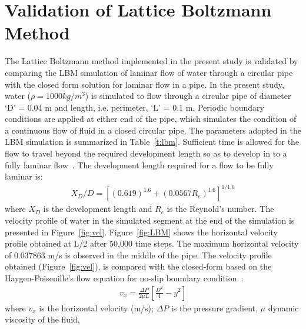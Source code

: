 \section{Validation of Lattice Boltzmann Method}
The Lattice Boltzmann method implemented in the present study is validated by comparing the LBM simulation of laminar flow of water through a circular pipe with the closed form solution for laminar flow in a pipe. In the present study, water ($\rho=1000 kg/m^{3}$) is simulated to flow through a circular pipe of diameter `D' = 0.04 m and length, i.e. perimeter, `L' = 0.1 m. Periodic boundary conditions are applied at either end of the pipe, which simulates the condition of a continuous flow of fluid in a closed circular pipe. The parameters adopted in the LBM simulation is summarized in Table~\ref{t:lbm}. Sufficient time is allowed for the flow to travel beyond the required development length so as to develop in to a fully laminar flow~\citet{durst2005}. The development length required for a flow to be fully laminar is:
\begin{align}
X_{D}/D=[(0.619)^{1.6}+(0.0567 R_{e})^{1.6}]^{1/1.6}
\end{align}
where $X_{D}$ is the development length and $R_{e}$ is the Reynold's number. The velocity profile of water in the simulated segment at the end of the simulation is presented in Figure~\ref{fig:vel}. Figure~\ref{fig:LBM} shows the horizontal velocity profile obtained at L/2 after 50,000 time steps. The maximum horizontal velocity of 0.037863 m/s is observed in the middle of the pipe. The velocity profile obtained (Figure~\ref{fig:vel}), is compared with the closed-form based on the Haygen-Poiseuille's flow equation for no-slip boundary condition~\citep{willis2008}:
\begin{align}
\textit{v}_{\textit{x}}=\frac{\Delta P}{2 \mu L} [\frac{D^{2}}{4}-y^{2}]
\end{align}
where $v_{x}$ is the horizontal velocity (m/s); $\Delta P$ is the pressure gradient, $\mu$ dynamic viscosity of the fluid, 
